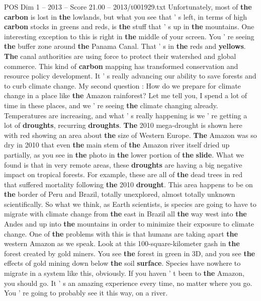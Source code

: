 \begin{textsample}{POS Dim 1 – 2013 – Score 21.00 – 2013/t001929.txt}
Unfortunately, most of \textbf{the} \textbf{carbon} is lost in \textbf{the} lowlands, but what you see that ' s left, in terms of high \textbf{carbon} stocks in greens and reds, is \textbf{the} stuff that ' s up in \textbf{the} mountains.
One interesting exception to this is right in \textbf{the} middle of your screen.
You ' re seeing \textbf{the} buffer zone around \textbf{the} Panama Canal.
That ' s in \textbf{the} reds and \textbf{yellows}. \textbf{The} canal authorities are using force to protect their watershed and global commerce.
This kind of \textbf{carbon} mapping has transformed conservation and resource policy development.
It ' s really advancing our ability to save forests and to curb climate change.
My second question : How do we prepare for climate change in a place like \textbf{the} Amazon rainforest?
Let me tell you, I spend a lot of time in these places, and we ' re seeing \textbf{the} climate changing already.
Temperatures are increasing, and what ' s really happening is we ' re getting a lot of \textbf{droughts}, recurring \textbf{droughts}. \textbf{The} 2010 mega-drought is shown here with red showing an area about \textbf{the} size of Western Europe. \textbf{The} Amazon was so dry in 2010 that even \textbf{the} main stem of \textbf{the} Amazon river itself dried up partially, as you see in \textbf{the} photo in \textbf{the} lower portion of \textbf{the} \textbf{slide}.
What we found is that in very remote areas, these \textbf{droughts} are having a big negative impact on tropical forests.
For example, these are all of \textbf{the} dead trees in red that suffered mortality following \textbf{the} 2010 \textbf{drought}.
This area happens to be on \textbf{the} border of Peru and Brazil, totally unexplored, almost totally unknown scientifically.
So what we think, as Earth scientists, is species are going to have to migrate with climate change from \textbf{the} east in Brazil all \textbf{the} way west into \textbf{the} Andes and up into \textbf{the} mountains in order to minimize their exposure to climate change.
One of \textbf{the} problems with this is that humans are taking apart \textbf{the} western Amazon as we speak.
Look at this 100-square-kilometer gash in \textbf{the} forest created by gold miners.
You see \textbf{the} forest in green in 3D, and you see \textbf{the} effects of gold mining down below \textbf{the} soil \textbf{surface}.
Species have nowhere to migrate in a system like this, obviously.
If you haven ' t been to \textbf{the} Amazon, you should go.
It ' s an amazing experience every time, no matter where you go.
You ' re going to probably see it this way, on a river.

\end{textsample}
